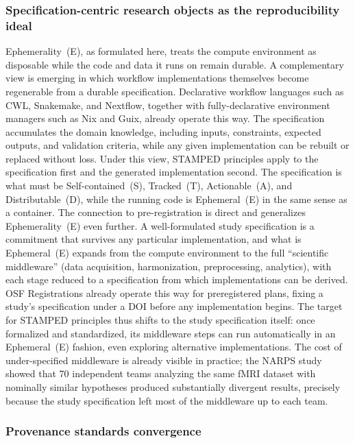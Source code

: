 \documentclass{article}
\makeatletter
\newcommand{\hyanchor}[1]{\texorpdfstring{\Hy@raisedlink{\hypertarget{#1}{}}}{}}
\newcommand{\anchoredsubsubsection}[2]{\subsubsection[#2]{\hyanchor{#1}#2}}
\makeatother
\begin{document}
\anchoredsubsubsection{spec-centric}{Specification-centric research objects as the reproducibility ideal}

Ephemerality~(E), as formulated here, treats the compute environment as disposable while the code and data it runs on remain durable.
A complementary view is emerging in which workflow implementations themselves become regenerable from a durable specification.
Declarative workflow languages such as CWL\cite{crusoe_methods_2022}, Snakemake\cite{molder_sustainable_2021}, and Nextflow\cite{di_tommaso_nextflow_2017}, together with fully-declarative environment managers such as Nix\cite{kowalewski_sustainable_2022} and Guix\cite{courtes_reproducible_2015}, already operate this way.
The specification accumulates the domain knowledge, including inputs, constraints, expected outputs, and validation criteria, while any given implementation can be rebuilt or replaced without loss.
Under this view, STAMPED principles apply to the specification first and the generated implementation second.
The specification is what must be Self-contained~(S), Tracked~(T), Actionable~(A), and Distributable~(D), while the running code is Ephemeral~(E) in the same sense as a container.
The connection to pre-registration is direct and generalizes Ephemerality~(E) even further\cite{nosek_preregistration_2018}.
A well-formulated study specification is a commitment that survives any particular implementation, and what is Ephemeral~(E) expands from the compute environment to the full ``scientific middleware'' (data acquisition,
harmonization, preprocessing, analytics), with each stage reduced to a specification from which implementations can be derived.
OSF Registrations\cite{foster_open_2017} already operate this way for preregistered plans, fixing a study's specification under a DOI before any implementation begins.
The target for STAMPED principles thus shifts to the study specification itself: once formalized and standardized, its middleware steps can run automatically in an Ephemeral~(E) fashion, even exploring alternative implementations.
The cost of under-specified middleware is already visible in practice; the NARPS study showed that 70 independent teams analyzing the same fMRI dataset with nominally similar hypotheses produced substantially divergent results\cite{botvinik-nezer_variability_2020}, precisely because the study specification left most of the middleware up to each team.

\anchoredsubsubsection{provenance-standards}{Provenance standards convergence}
\end{document}
